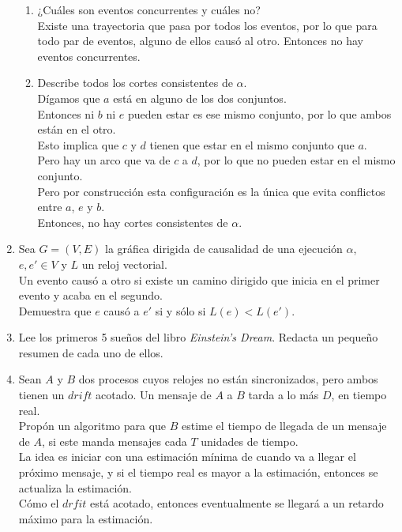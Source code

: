 \documentclass[12pt,a4paper]{report}
\begin{document}
\begin{enumerate}
{\begin{enumerate}
{\begin{tabular}{| c | c | c | c |}
						\hline
					\end{tabular}
				}

				\item {
					¿Cuáles son eventos concurrentes y cuáles no?\\
					Existe una trayectoria que pasa por todos los eventos, por
					lo que para todo par de eventos, alguno de ellos causó al
					otro. Entonces no hay eventos concurrentes.
				}

				\item {
					Describe todos los cortes consistentes de $\alpha$.\\
					Dígamos que $a$ está en alguno de los dos conjuntos. \\
					Entonces ni $b$ ni $e$ pueden estar es ese mismo conjunto,
					por lo que ambos están en el otro. \\
					Esto implica que $c$ y $d$ tienen que estar en el mismo
					conjunto que $a$. \\
					Pero hay un arco que va de $c$ a $d$, por lo que no pueden
					estar en el mismo conjunto. \\
					Pero por construcción esta configuración es la única que
					evita conflictos entre $a$, $e$ y $b$.\\
					Entonces, no hay cortes consistentes de $\alpha$.
				}
			\end{enumerate}
		}

		\item {
			Sea $G = (V, E)$ la gráfica dirigida de causalidad de una ejecución
			$\alpha$, $e, e' \in V$ y $L$ un reloj vectorial.\\
			Un evento causó a otro si existe un camino dirigido que inicia en
			el primer evento y acaba en el segundo.\\
			Demuestra que $e$ causó a $e'$ si y sólo si $L(e) < L(e')$.
		}

		\item {
			Lee los primeros 5 sueños del libro \textit{Einstein's Dream}.
			Redacta un pequeño resumen de cada uno de ellos.
		}

		\item {
			Sean $A$ y $B$ dos procesos cuyos relojes no están sincronizados,
			pero ambos tienen un $drift$ acotado. Un mensaje de $A$ a $B$
			tarda a lo más $D$, en tiempo real.\\
			Propón un algoritmo para que $B$ estime el tiempo de llegada de un
			mensaje de $A$, si este manda mensajes cada $T$ unidades de tiempo.\\
			La idea es iniciar con una estimación mínima de cuando va a llegar
			el próximo mensaje, y si el tiempo real es mayor a la estimación,
			entonces se actualiza la estimación.\\
			Cómo el $drfit$ está acotado, entonces eventualmente se llegará a
			un retardo máximo para la estimación.

}
\end{enumerate}
\end{document}
